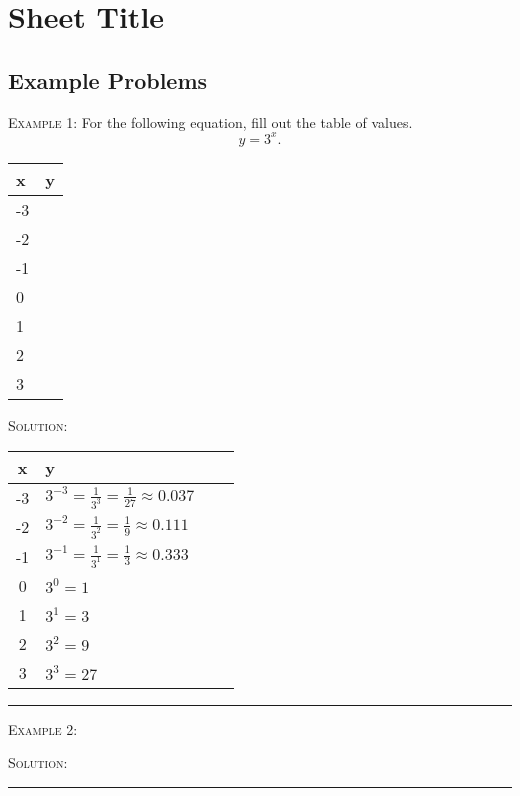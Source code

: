 \documentclass[a4paper,12pt]{article}
\begin{document}
\section*{Sheet Title}

\subsection*{Example Problems}

\textsc{Example 1}: For the following equation, fill out 
the table of values.
$$y = 3^x.$$
\begin{tabular}{|l|l|}
\hline
x & y \\
\hline
-3 & \\
\hline
-2 & \\
\hline
-1 & \\
\hline
0 & \\
\hline
1 & \\
\hline
2 & \\
\hline
3 & \\
\hline
\end{tabular}

\vspace{3mm}

\textsc{Solution}: 

\vspace{3mm}

\begin{tabular}{|Sl|Sl|}
\hline
x & y \\
 & $3^{-3} = \frac{1}{3^3} = \frac{1}{27} \approx 0.037$ \\
 & $3^{-2} = \frac{1}{3^2} = \frac{1}{9} \approx 0.111$ \\
 & $3^{-1} = \frac{1}{3^1} = \frac{1}{3} \approx 0.333$ \\
 & $3^0 = 1$ \\
 & $3^1 = 3$ \\
 & $3^2 = 9$ \\
 & $3^3 = 27$ \\
\hline
\end{tabular}
\vspace{3mm}
\hrule
\vspace{3mm}

\textsc{Example 2}: 

\textsc{Solution}: 

\vspace{3mm}
\hrule
\vspace{3mm}
\end{document}
